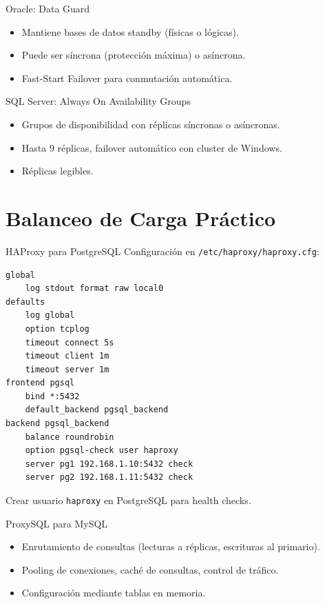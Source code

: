 \documentclass[aspectratio=169, 10pt, xcolor=table]{beamer}
\begin{document}
\begin{frame}{Oracle: Data Guard}
    \begin{itemize}
        \item Mantiene bases de datos standby (físicas o lógicas).
        \item Puede ser síncrona (protección máxima) o asíncrona.
        \item Fast-Start Failover para conmutación automática.
    \end{itemize}
\end{frame}

\begin{frame}{SQL Server: Always On Availability Groups}
    \begin{itemize}
        \item Grupos de disponibilidad con réplicas síncronas o asíncronas.
        \item Hasta 9 réplicas, failover automático con cluster de Windows.
        \item Réplicas legibles.
    \end{itemize}
\end{frame}

\section{Balanceo de Carga Práctico}

\begin{frame}[fragile]{HAProxy para PostgreSQL}
    Configuración en \texttt{/etc/haproxy/haproxy.cfg}:
    \begin{lstlisting}[style=bashstyle]
global
    log stdout format raw local0
defaults
    log global
    option tcplog
    timeout connect 5s
    timeout client 1m
    timeout server 1m
frontend pgsql
    bind *:5432
    default_backend pgsql_backend
backend pgsql_backend
    balance roundrobin
    option pgsql-check user haproxy
    server pg1 192.168.1.10:5432 check
    server pg2 192.168.1.11:5432 check
    \end{lstlisting}
    Crear usuario \texttt{haproxy} en PostgreSQL para health checks.
\end{frame}

\begin{frame}{ProxySQL para MySQL}
    \begin{itemize}
        \item Enrutamiento de consultas (lecturas a réplicas, escrituras al primario).
        \item Pooling de conexiones, caché de consultas, control de tráfico.
        \item Configuración mediante tablas en memoria.
    \end{itemize}
\end{frame}
\end{document}
